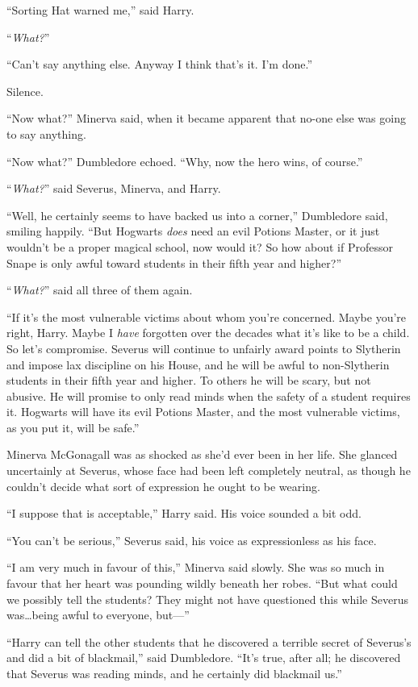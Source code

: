 “Sorting Hat warned me,” said Harry.

“\emph{What?}”

“Can’t say anything else. Anyway I think that’s it. I’m done.”

Silence.

“Now what?” Minerva said, when it became apparent that no-one else was going to say anything.

“Now what?” Dumbledore echoed. “Why, now the hero wins, of course.”

“\emph{What?}” said Severus, Minerva, and Harry.

“Well, he certainly seems to have backed us into a corner,” Dumbledore said, smiling happily. “But Hogwarts \emph{does} need an evil Potions Master, or it just wouldn’t be a proper magical school, now would it? So how about if Professor Snape is only awful toward students in their fifth year and higher?”

“\emph{What?}” said all three of them again.

“If it’s the most vulnerable victims about whom you’re concerned. Maybe you’re right, Harry. Maybe I \emph{have} forgotten over the decades what it’s like to be a child. So let’s compromise. Severus will continue to unfairly award points to Slytherin and impose lax discipline on his House, and he will be awful to non-Slytherin students in their fifth year and higher. To others he will be scary, but not abusive. He will promise to only read minds when the safety of a student requires it. Hogwarts will have its evil Potions Master, and the most vulnerable victims, as you put it, will be safe.”

Minerva McGonagall was as shocked as she’d ever been in her life. She glanced uncertainly at Severus, whose face had been left completely neutral, as though he couldn’t decide what sort of expression he ought to be wearing.

“I suppose that is acceptable,” Harry said. His voice sounded a bit odd.

“You can’t be serious,” Severus said, his voice as expressionless as his face.

“I am very much in favour of this,” Minerva said slowly. She was so much in favour that her heart was pounding wildly beneath her robes. “But what could we possibly tell the students? They might not have questioned this while Severus was…being awful to everyone, but—”

“Harry can tell the other students that he discovered a terrible secret of Severus’s and did a bit of blackmail,” said Dumbledore. “It’s true, after all; he discovered that Severus was reading minds, and he certainly did blackmail us.”

